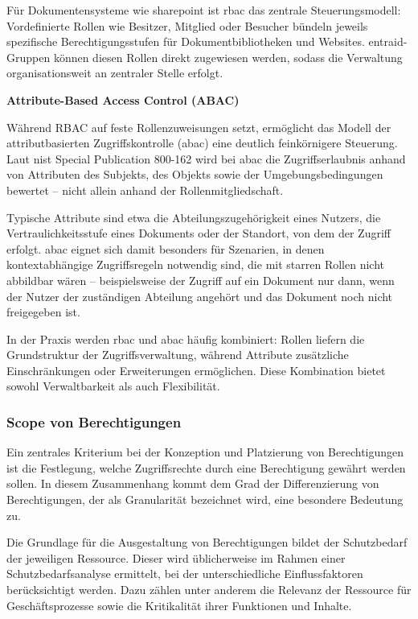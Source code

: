 Für Dokumentensysteme wie \gls{sharepoint} ist \acrshort{rbac} das zentrale Steuerungsmodell:
Vordefinierte Rollen wie Besitzer, Mitglied oder
Besucher bündeln jeweils spezifische Berechtigungsstufen für
Dokumentbibliotheken und Websites. \gls{entraid}-Gruppen können diesen Rollen direkt
zugewiesen werden, sodass die Verwaltung organisationsweit an zentraler Stelle
erfolgt.
\cite{tsolkas2017rollen,sandhu1996rbac}

\textbf{Attribute-Based Access Control (ABAC)}

Während RBAC auf feste Rollenzuweisungen setzt, ermöglicht das Modell der
attributbasierten Zugriffskontrolle (\acrshort{abac}) eine deutlich feinkörnigere Steuerung.
Laut \acrshort{nist} Special Publication 800-162 wird bei \acrshort{abac} die Zugriffserlaubnis anhand
von Attributen des Subjekts, des Objekts sowie der Umgebungsbedingungen bewertet –
nicht allein anhand der Rollenmitgliedschaft. \cite{hu2014abac}

Typische Attribute sind etwa die Abteilungszugehörigkeit eines Nutzers, die
Vertraulichkeitsstufe eines Dokuments oder der Standort, von dem der Zugriff
erfolgt. \acrshort{abac} eignet sich damit besonders für Szenarien, in denen
kontextabhängige Zugriffsregeln notwendig sind, die mit starren Rollen nicht
abbildbar wären – beispielsweise der Zugriff auf ein Dokument nur dann, wenn der
Nutzer der zuständigen Abteilung angehört und das Dokument noch nicht
freigegeben ist.
\cite{hu2014abac,sandhu1996rbac}

In der Praxis werden \acrshort{rbac} und \acrshort{abac} häufig kombiniert: Rollen liefern die
Grundstruktur der Zugriffsverwaltung, während Attribute zusätzliche Einschränkungen
oder Erweiterungen ermöglichen. Diese Kombination bietet sowohl Verwaltbarkeit als
auch Flexibilität.
\cite{hu2014abac,ferraiolo1992rbac}

\subsubsection{Scope von Berechtigungen}

Ein zentrales Kriterium bei der Konzeption und Platzierung von Berechtigungen ist
die Festlegung, welche Zugriffsrechte durch eine Berechtigung gewährt werden sollen.
In diesem Zusammenhang kommt dem Grad der Differenzierung von Berechtigungen,
der als Granularität bezeichnet wird, eine besondere Bedeutung zu.
\cite{tsolkas2017rollen}

Die Grundlage für die Ausgestaltung von Berechtigungen bildet der Schutzbedarf der
jeweiligen Ressource. Dieser wird üblicherweise im Rahmen einer
Schutzbedarfsanalyse ermittelt, bei der unterschiedliche Einflussfaktoren
berücksichtigt werden. Dazu zählen unter anderem die Relevanz der Ressource für
Geschäftsprozesse sowie die Kritikalität ihrer Funktionen und Inhalte.
\cite{tsolkas2017rollen,hu2014abac}

